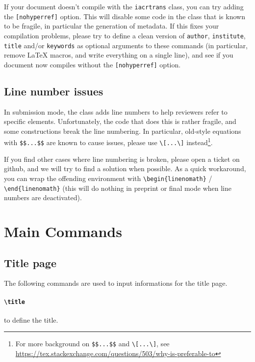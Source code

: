 \documentclass{iacrtrans}
\begin{document}
If your document doesn't compile with the \texttt{iacrtrans} class,
you can try adding the \texttt{[nohyperref]} option.  This will
disable some code in the class that is known to be fragile, in
particular the generation of metadata.  If this fixes your compilation
problems, please try to define a clean version of \texttt{author}, \texttt{institute},
\texttt{title} and/or \texttt{keywords} as optional arguments to
these commands (in particular, remove \LaTeX{} macros, and write
everything on a single line), and see if you document now compiles
without the \texttt{[nohyperref]} option.

\subsection{Line number issues}

In submission mode, the class adds line numbers to help reviewers refer
to specific elements.  Unfortunately, the code that does this is rather
fragile, and some constructions break the line numbering.  In
particular, old-style equations with \verb+$$...$$+ are known to cause
issues, please use \verb+\[...\]+ instead\footnote{For more background
  on \texttt{\$\$...\$\$} and \texttt{\textbackslash[...\textbackslash]},
  see \url{https://tex.stackexchange.com/questions/503/why-is-preferable-to}}.

If you find other cases where line numbering is broken, please open a
ticket on github, and we will try to find a solution when possible.
As a quick workaround, you can wrap the offending environment with
\verb+\begin{linenomath}+ / \verb+\end{linenomath}+ (this will do
nothing in preprint or final mode when line numbers are deactivated).

\section{Main Commands}

\subsection{Title page}

The following commands are used to input informations for the title page.

\paragraph{\texttt{\textbackslash title}} to define the title.
\end{document}
